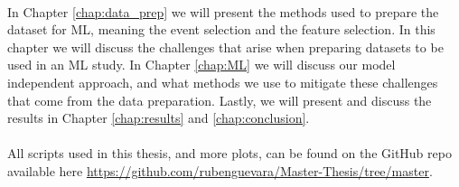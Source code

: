 \documentclass[12pt, a4paper]{book}
\begin{document}
\\In Chapter \ref{chap:data_prep} we will present the methods used to prepare the dataset for ML, meaning the event selection and the feature selection. In this chapter we will discuss the challenges that arise when preparing datasets to be used in an ML study. 
In Chapter \ref{chap:ML} we will discuss our model independent approach, and what methods we use to mitigate these challenges that come from the data preparation. Lastly, we will present and discuss the results in Chapter \ref{chap:results} 
and \ref{chap:conclusion}.\\
\\All scripts used in this thesis, and more plots, can be found on the GitHub repo available here \href{https://github.com/rubenguevara/Master-Thesis/tree/master}{https://github.com/rubenguevara/Master-Thesis/tree/master}.
\end{document}
